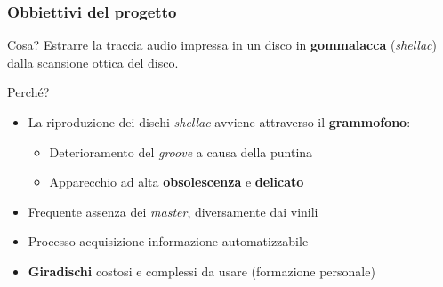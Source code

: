 \begin{frame}

\frametitle{Obbiettivi del progetto}

\begin{block}{Cosa?}
Estrarre la traccia audio impressa in un disco in \textbf{gommalacca}
(\emph{shellac}) dalla scansione ottica del disco.
\end{block}

\begin{block}{Perché?}
\begin{itemize}
\item La riproduzione dei dischi \emph{shellac} avviene attraverso il \textbf{grammofono}:
\vspace{-0.4cm}
\begin{itemize}
\item Deterioramento del \emph{groove} a causa della puntina
\item Apparecchio ad alta \textbf{obsolescenza} e \textbf{delicato}
\end{itemize}
\item Frequente assenza dei \emph{master}, diversamente dai vinili
\item Processo acquisizione informazione automatizzabile
\item \textbf{Giradischi} costosi e complessi da usare (formazione personale)
\end{itemize}
\end{block}

\end{frame}
